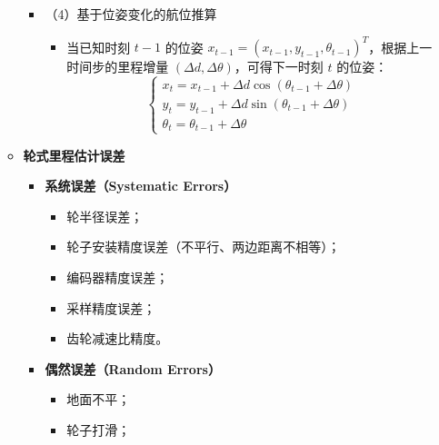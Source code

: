 \documentclass[../main.tex]{subfiles}
\begin{document}
\begin{enumerate}
\begin{itemize}
\begin{itemize}
                \item （4）基于位姿变化的航位推算
                \begin{itemize}
                    \item 当已知时刻 \(t-1\) 的位姿 \(x_{t-1} = (x_{t-1}, y_{t-1}, \theta_{t-1})^T\)，根据上一时间步的里程增量 \((\Delta d, \Delta \theta)\)，可得下一时刻 \(t\) 的位姿：
                    \[
                    \begin{cases}
                    x_t = x_{t-1} + \Delta d \cos(\theta_{t-1} + \Delta\theta) \\
                    y_t = y_{t-1} + \Delta d \sin(\theta_{t-1} + \Delta\theta) \\
                    \theta_t = \theta_{t-1} + \Delta\theta
                    \end{cases}
                    \]
                \end{itemize}
            \end{itemize}
    
            \item \textbf{轮式里程估计误差}
            \begin{itemize}
                \item \textbf{系统误差（Systematic Errors）}
                \begin{itemize}
                    \item 轮半径误差；
                    \item 轮子安装精度误差（不平行、两边距离不相等）；
                    \item 编码器精度误差；
                    \item 采样精度误差；
                    \item 齿轮减速比精度。
                \end{itemize}
    
                \item \textbf{偶然误差（Random Errors）}
                \begin{itemize}
                    \item 地面不平；
                    \item 轮子打滑；
                \end{itemize}
    

\end{itemize}
\end{itemize}
\end{enumerate}
\end{document}
